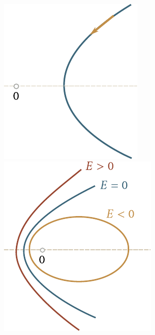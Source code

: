 \begin{figure}[t]
	\begin{minipage}[t]{0.5\linewidth}
		\begin{center}
			\includegraphics[scale=1]{figures/ch_03/fig_3_28.pdf}
			\caption[]{}
			\label{fig:3_28}
		\end{center}
	\end{minipage}
	\hspace{-0.2cm}
	\begin{minipage}[t]{0.5\linewidth}
		\begin{center}
			\includegraphics[scale=1]{figures/ch_03/fig_3_29.pdf}
			\caption[]{}
			\label{fig:3_29}
		\end{center}
	\end{minipage}
	\vspace{-0.3cm}
\end{figure}

